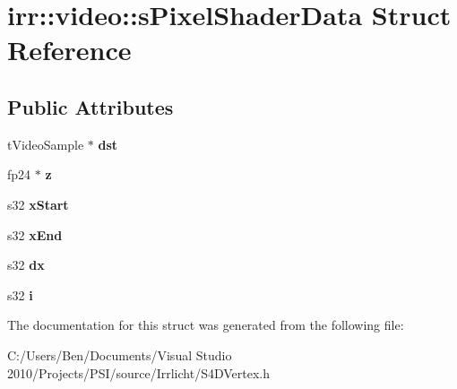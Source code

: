 \hypertarget{structirr_1_1video_1_1s_pixel_shader_data}{\section{irr\-:\-:video\-:\-:s\-Pixel\-Shader\-Data Struct Reference}
\label{structirr_1_1video_1_1s_pixel_shader_data}
}
\subsection*{Public Attributes}
\begin{DoxyCompactItemize}
\item 
\hypertarget{structirr_1_1video_1_1s_pixel_shader_data_a17ebe0eaeac3e79c2d28c2418904b712}{t\-Video\-Sample $\ast$ {\bfseries dst}}\label{structirr_1_1video_1_1s_pixel_shader_data_a17ebe0eaeac3e79c2d28c2418904b712}

\item 
\hypertarget{structirr_1_1video_1_1s_pixel_shader_data_a1298f51be457d50b09588f903997bbaa}{fp24 $\ast$ {\bfseries z}}\label{structirr_1_1video_1_1s_pixel_shader_data_a1298f51be457d50b09588f903997bbaa}

\item 
\hypertarget{structirr_1_1video_1_1s_pixel_shader_data_a27992bc418aa1918b0e1652df0734ad7}{s32 {\bfseries x\-Start}}\label{structirr_1_1video_1_1s_pixel_shader_data_a27992bc418aa1918b0e1652df0734ad7}

\item 
\hypertarget{structirr_1_1video_1_1s_pixel_shader_data_a48a19415a08ee0aacbd9a933e62ff80d}{s32 {\bfseries x\-End}}\label{structirr_1_1video_1_1s_pixel_shader_data_a48a19415a08ee0aacbd9a933e62ff80d}

\item 
\hypertarget{structirr_1_1video_1_1s_pixel_shader_data_ae02721c31d350619972e700723c0f7ca}{s32 {\bfseries dx}}\label{structirr_1_1video_1_1s_pixel_shader_data_ae02721c31d350619972e700723c0f7ca}

\item 
\hypertarget{structirr_1_1video_1_1s_pixel_shader_data_a04de6a25fc8b7964a3efaf4091bfbfd3}{s32 {\bfseries i}}\label{structirr_1_1video_1_1s_pixel_shader_data_a04de6a25fc8b7964a3efaf4091bfbfd3}

\end{DoxyCompactItemize}


The documentation for this struct was generated from the following file\-:\begin{DoxyCompactItemize}
\item 
C\-:/\-Users/\-Ben/\-Documents/\-Visual Studio 2010/\-Projects/\-P\-S\-I/source/\-Irrlicht/S4\-D\-Vertex.\-h\end{DoxyCompactItemize}
